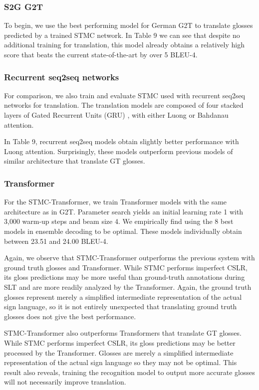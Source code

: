 \documentclass[11pt]{article}
\begin{document}
\subsubsection*{ S2G G2T}

To begin, we use the best performing model for German G2T to translate glosses predicted by a trained STMC network. In Table 9 we can see that despite  no additional training for translation, this model already obtains a relatively high score that beats the current state-of-the-art by over 5 BLEU-4. 

\subsubsection*{Recurrent seq2seq networks}
For comparison, we also train and evaluate STMC used with recurrent seq2seq networks for translation. The translation models are composed of four stacked layers of Gated Recurrent Units (GRU) \cite{gru}, with either Luong \cite{luong} or Bahdanau \cite{bahdanau} attention.

In Table 9, recurrent seq2seq models obtain slightly better performance with Luong attention. Surprisingly, these models outperform previous models of similar architecture that translate GT glosses.


\subsubsection*{Transformer}

For the STMC-Transformer, we train Transformer models with the same architecture as in G2T. Parameter search yields an initial learning rate 1 with 3,000 warm-up steps and beam size 4. We empirically find using the 8 best models in ensemble decoding to be optimal. These models individually obtain between 23.51 and 24.00 BLEU-4.

Again, we observe that STMC-Transformer outperforms the previous system with ground truth glosses and Transformer. While STMC performs imperfect CSLR, its gloss predictions may be more useful than ground-truth annotations during SLT and are more readily analyzed by the Transformer. Again, the ground truth glosses represent merely a simplified intermediate representation of the actual sign language, so it is not entirely unexpected that translating ground truth glosses does not give the best performance.

STMC-Transformer also outperforms Transformers that translate GT glosses. While STMC performs imperfect CSLR, its gloss predictions may be better processed by the Transformer. Glosses are merely a simplified intermediate representation of the actual sign language so they may not be optimal. This result also reveals, training the recognition model to output more accurate glosses will not necessarily improve translation.
\end{document}
